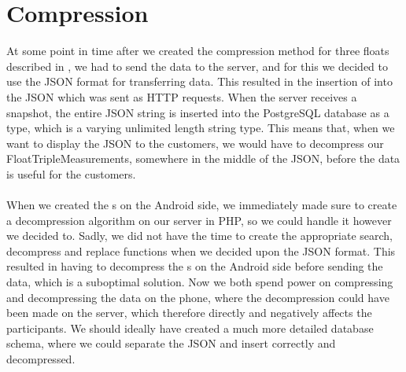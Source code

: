 
\section{Compression}
\label{sec:reflection_compression}

At some point in time after we created the compression method for three floats described in , we had to send the data to the server, and for this we decided to use the JSON format for transferring data. This resulted in the insertion of  into the JSON which was sent as HTTP requests. When the server receives a snapshot, the entire JSON string is inserted into the PostgreSQL database as a  type, which is a varying unlimited length string type. This means that, when we want to display the JSON to the customers, we would have to decompress our FloatTripleMeasurements, somewhere in the middle of the JSON, before the data is useful for the customers.
\\\\
When we created the s on the Android side, we immediately made sure to create a decompression algorithm on our server in PHP, so we could handle it however we decided to. Sadly, we did not have the time to create the appropriate search, decompress and replace functions when we decided upon the JSON format. This resulted in having to decompress the s on the Android side before sending the data, which is a suboptimal solution. Now we both spend power on compressing and decompressing the data on the phone, where the decompression could have been made on the server, which therefore directly and negatively affects the participants. We should ideally have created a much more detailed database schema, where we could separate the JSON and insert correctly and decompressed.